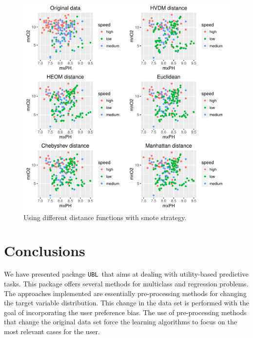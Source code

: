 \documentclass[10pt,a4paper]{article}\usepackage[]{graphicx}\usepackage[]{color}
\makeatletter
\def\maxwidth{ %
  \ifdim\Gin@nat@width>\linewidth
    \linewidth
  \else
    \Gin@nat@width
  \fi
}
\newenvironment{knitrout}{}{} %
\newcommand{\pUBL}{package \texttt{UBL}\ }
\makeatother
\begin{document}
\begin{knitrout}\footnotesize
{}\color{fgcolor}\begin{figure}

{\centering \includegraphics[width=\maxwidth]{figures/UBL-dist_HVDM2-1} 

}

\caption[Using different distance functions with  smote strategy]{Using different distance functions with  smote strategy.}\label{fig:dist_HVDM2}
\end{figure}


\end{knitrout}



\section{Conclusions}\label{sec:conc}

We have presented \pUBL that aims at dealing with utility-based predictive tasks. This package offers several methods for multiclass and regression problems. The approaches implemented are essentially pre-processing methods for changing the target variable distribution. This change in the data set is performed with the goal of incorporating the user preference bias. The use of pre-processing methods that change the original data set force the learning algorithms to focus on the most relevant cases for the user.
\end{document}

